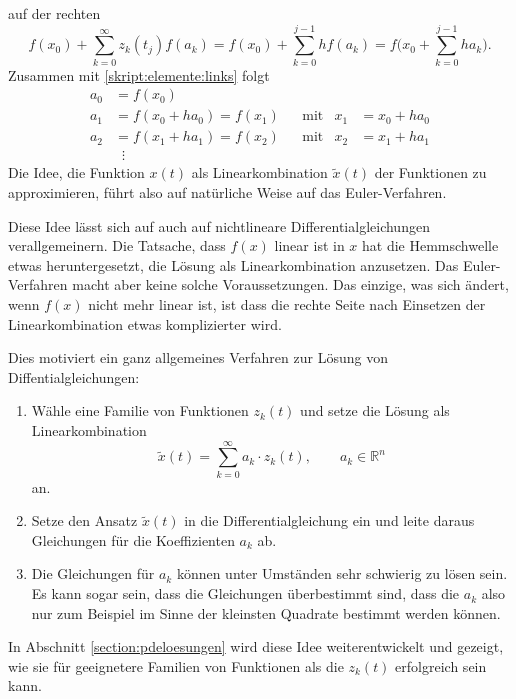 auf der  rechten
\begin{equation}
f(x_0) + \sum_{k=0}^\infty z_k(t_j) f(a_k)
=
f(x_0) + \sum_{k=0}^{j-1} hf(a_k)
=
f\biggl(x_0 + \sum_{k=0}^{j-1} ha_k\biggr).
\label{skript:elemente:rechts}
\end{equation}
Zusammen mit \eqref{skript:elemente:links} folgt
\[
\begin{aligned}
a_0 &= f(x_0)                 &&          &    & \\
a_1 &= f(x_0 + ha_0) = f(x_1) &&\text{mit}&x_1 &= x_0 + ha_0\\
a_2 &= f(x_1 + ha_1) = f(x_2) &&\text{mit}&x_2 &= x_1 + ha_1\\
    &\;\;\vdots
\end{aligned}
\]
Die Idee, die Funktion $x(t)$ als Linearkombination $\tilde{x}(t)$
der Funktionen zu approximieren, führt also auf natürliche Weise
auf das Euler-Verfahren.

Diese Idee lässt sich auf auch auf nichtlineare Differentialgleichungen
verallgemeinern.
Die Tatsache, dass $f(x)$ linear ist in $x$ hat die Hemmschwelle etwas
heruntergesetzt, die Lösung als Linearkombination anzusetzen.
Das Euler-Verfahren macht aber keine solche Voraussetzungen.
Das einzige, was sich ändert, wenn $f(x)$ nicht mehr linear ist,
ist dass die rechte Seite nach Einsetzen der Linearkombination
etwas komplizierter wird.

Dies motiviert ein ganz allgemeines Verfahren zur Lösung von
Diffentialgleichungen:
\begin{enumerate}
\item Wähle eine Familie von Funktionen $z_k(t)$ und setze die Lösung
als Linearkombination
\[
\tilde{x}(t) = \sum_{k=0}^\infty a_k\cdot z_k(t), \qquad a_k\in\mathbb R^n
\]
an.
\item Setze den Ansatz $\tilde{x}(t)$ in die Differentialgleichung ein
und leite daraus Gleichungen für die Koeffizienten $a_k$ ab.
\item Die Gleichungen für $a_k$ können unter Umständen sehr schwierig 
zu lösen sein.
Es kann sogar sein, dass die Gleichungen überbestimmt sind, dass die
$a_k$ also nur zum Beispiel im Sinne der kleinsten Quadrate bestimmt
werden können.
\end{enumerate}
In Abschnitt \ref{section:pdeloesungen} wird diese Idee weiterentwickelt
und gezeigt, wie sie für geeignetere Familien von Funktionen als die $z_k(t)$
erfolgreich sein kann.



